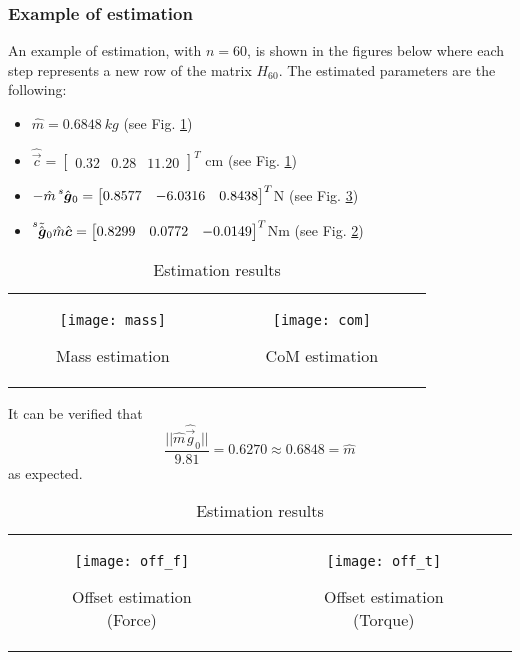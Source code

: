 \subsubsection{Example of estimation}
An example of estimation, with $n=60$, is shown in the figures below where each step represents a new row of the
matrix $H_{60}$. The estimated parameters are the following:
\begin{itemize}
\item $\hat{m} = \SI{0.6848}{kg}$ (see Fig. \ref{fig:mass_estimation})
\item $\hat{\vec{c}} =
  \begin{bmatrix}
    0.32 & 0.28 & 11.20
  \end{bmatrix}^T$ cm  (see Fig. \ref{fig:com_estimation})
\item $-\hat{m} \prescript{s}{}{ \hat{\vec{g}}}_{0} =
  \begin{bmatrix}
    0.8577 & -6.0316 & 0.8438 
  \end{bmatrix}^T
  $N  (see Fig. \ref{fig:off_f_estimation})
\item $\prescript{s}{}{ \tilde{\hat{\vec{g}}}}_{0} \hat{m}\hat{\vec{c}} =
  \begin{bmatrix}
    0.8299 & 0.0772 & -0.0149  
  \end{bmatrix}^T
  $Nm  (see Fig. \ref{fig:off_t_estimation})
\end{itemize}
\begin{table}[h]
  \begin{tabular}{cc}
    \begin{subfigure}{0.5\textwidth}
      \centering
      \texttt{[image: mass]}
      \caption{Mass estimation \label{fig:mass_estimation}}
    \end{subfigure}&
    \begin{subfigure}{0.5\textwidth}
      \centering
      \texttt{[image: com]}
      \caption{CoM estimation\label{fig:com_estimation}}
    \end{subfigure}
  \end{tabular}
  \caption{Estimation results}
\end{table}
It can be verified that
\[
\frac{||\hat{m}\hat{\vec{g}}_0||}{9.81} = 0.6270 \approx 0.6848 = \hat{m}
\]
as expected.
\begin{table}[h]
  \begin{tabular}{cc}
    \begin{subfigure}{0.5\textwidth}
      \centering
      \texttt{[image: off\_f]}
      \caption{Offset estimation (Force) \label{fig:off_f_estimation}}
    \end{subfigure}&
    \begin{subfigure}{0.5\textwidth}
      \centering
      \texttt{[image: off\_t]}
      \caption{Offset estimation (Torque) \label{fig:off_t_estimation}}
    \end{subfigure}
  \end{tabular}
  \caption{Estimation results}
\end{table}
\newpage
